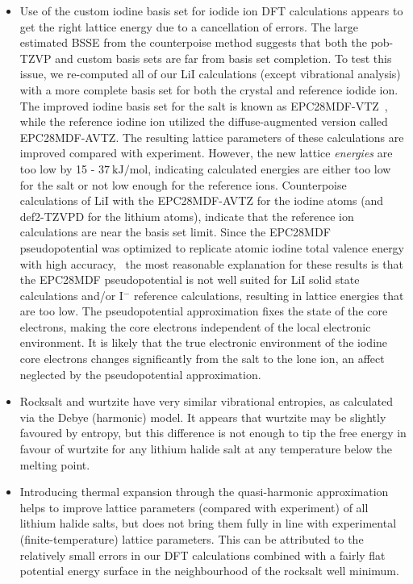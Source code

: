 \documentclass[preprint,aps,prb,floatfix]{revtex4-1}
\begin{document}
\begin{itemize}
	\item Use of the custom iodine basis set for iodide ion DFT calculations appears to get the right lattice energy due to a cancellation of errors. The large estimated BSSE from the counterpoise method suggests that both the pob-TZVP and custom basis sets are far from basis set completion. To test this issue, we re-computed all of our LiI calculations (except vibrational analysis) with a more complete basis set for both the crystal and reference iodide ion. The improved iodine basis set for the salt is known as EPC28MDF-VTZ~\cite{peterson2006spectroscopic}, while the reference iodine ion utilized the diffuse-augmented version called EPC28MDF-AVTZ. The resulting lattice parameters of these calculations are  improved compared with experiment. However, the new lattice \textit{energies} are too low by 15 - $\SI{37}{\kilo\joule\per\mole}$, indicating calculated energies are either too low for the salt or not low enough for the reference ions. Counterpoise calculations of LiI with the EPC28MDF-AVTZ for the iodine atoms (and def2-TZVPD for the lithium atoms), indicate that the reference ion calculations are near the basis set limit. Since the EPC28MDF pseudopotential was optimized to replicate atomic iodine total valence energy with high accuracy,~\cite{peterson2006spectroscopic} the most reasonable explanation for these results is that the EPC28MDF pseudopotential is not well suited for LiI solid state calculations and/or I$^{-}$ reference calculations, resulting in lattice energies that are too low. The pseudopotential approximation fixes the state of the core electrons, making the core electrons independent of the local electronic environment. It is likely that the true electronic environment of the iodine core electrons changes significantly from the salt to the lone ion, an affect neglected by the pseudopotential approximation.
	\item Rocksalt and wurtzite have very similar vibrational entropies, as calculated via the Debye (harmonic) model. It appears that wurtzite may be slightly favoured by entropy, but this difference is not enough to tip the free energy in favour of wurtzite for any lithium halide salt at any temperature below the melting point.
	\item Introducing thermal expansion through the quasi-harmonic approximation helps to improve lattice parameters (compared with experiment) of all lithium halide salts, but does not bring them fully in line with experimental (finite-temperature) lattice parameters. This can be attributed to the relatively small errors in our DFT calculations combined with a fairly flat potential energy surface in the neighbourhood of the rocksalt well minimum.

\end{itemize}
\end{document}

